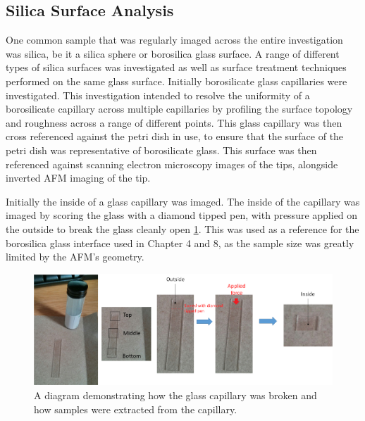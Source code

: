 \subsection{Silica Surface Analysis}

 One common sample that was regularly imaged across the entire investigation was silica, be it a silica sphere or borosilica glass surface. A range of different types of silica surfaces was investigated as well as surface treatment techniques performed on the same glass surface. Initially borosilicate glass capillaries were investigated. This investigation intended to resolve the uniformity of a borosilicate capillary across multiple capillaries by profiling the surface topology and roughness across a range of different points. This glass capillary was then cross referenced against the petri dish in use, to ensure that the surface of the petri dish was representative of borosilicate glass. This surface was then referenced against scanning electron microscopy images of the tips, alongside inverted AFM imaging of the tip.

Initially the inside of a glass capillary was imaged. The inside of the capillary was imaged by scoring the glass with a diamond tipped pen, with pressure applied on the outside to break the glass cleanly open \ref{fig:figure8}. This was used as a reference for the borosilica glass interface used in Chapter 4 and 8, as the sample size was greatly limited by the AFM's geometry.

\begin{figure}[h]     %
        \begin{center}
          \includegraphics[width=120mm]{chapter3/Figure8.png}
\end{center}
\caption{A diagram demonstrating how the glass capillary was broken and how samples were extracted from the capillary.}
\label{fig:figure8}                 %
\end{figure}   


